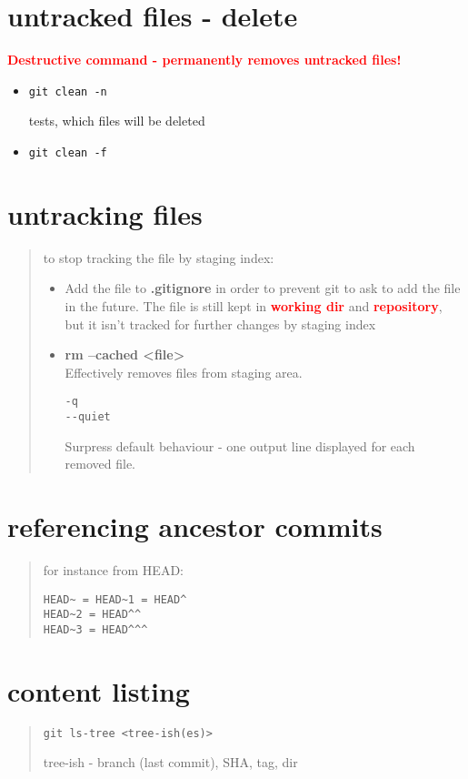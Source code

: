 \documentclass{report}
\begin{document}
\section{untracked files - delete}
\textbf{\textcolor{red}{Destructive command - permanently removes untracked files!}}
\begin{itemize}
\item \begin{verbatim}
git clean -n
\end{verbatim}
tests, which files will be deleted
\item \begin{verbatim}
git clean -f
\end{verbatim}
\end{itemize}


\section{untracking files}
\begin{quote}
to stop tracking the  file by staging index:
\begin{itemize}
	\item Add the file to \textbf{.gitignore} in order to prevent git to ask to add the file in the future.
	The file is still kept in \textcolor{red}{\textbf{working dir}} and \textcolor{red}{\textbf{repository}}, but it isn't tracked for further changes by staging index
   \item \textbf{rm  --cached \textless file\textgreater}\\
Effectively removes files from staging area.
\begin{verbatim}
-q
--quiet
\end{verbatim}
Surpress default behaviour - one output line displayed for each removed file. 
\end{itemize}
\end{quote}


\section{referencing ancestor commits}
\begin{quote}
for instance from HEAD:
\begin{verbatim}
HEAD~ = HEAD~1 = HEAD^
HEAD~2 = HEAD^^
HEAD~3 = HEAD^^^
\end{verbatim}
\end{quote}


\section{content listing}
\begin{quote}
\begin{verbatim}
git ls-tree <tree-ish(es)>
\end{verbatim}
tree-ish - branch (last commit), SHA, tag, dir
\end{quote}
\end{document}
